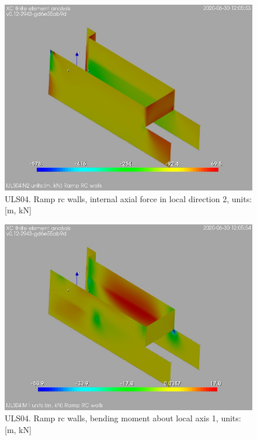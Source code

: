\begin{figure}
\begin{center}
\includegraphics[width=\linewidth]{ramp_wall/resLC/text/graphics/resSimplLC/lULS04wallsN2}
\caption{ULS04. Ramp rc walls, internal axial force in local direction 2, units:[m, kN]}
\end{center}
\end{figure}
\begin{figure}
\begin{center}
\includegraphics[width=\linewidth]{ramp_wall/resLC/text/graphics/resSimplLC/lULS04wallsM1}
\caption{ULS04. Ramp rc walls, bending moment about local axis 1, units:[m, kN]}
\end{center}
\end{figure}
